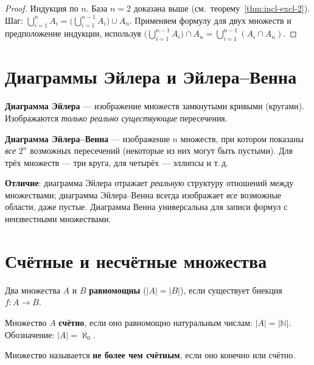 \documentclass[12pt]{article}
\begin{document}
\begin{proof}
Индукция по $n$. База $n=2$ доказана выше (см.~теорему~\ref{thm:incl-excl-2}).
Шаг: $\bigcup_{i=1}^n A_i = \bigl(\bigcup_{i=1}^{n-1} A_i\bigr) \cup A_n$.
Применяем формулу для двух множеств и предположение индукции, используя
$\bigl(\bigcup_{i=1}^{n-1} A_i\bigr) \cap A_n = \bigcup_{i=1}^{n-1}(A_i \cap A_n)$.
\end{proof}

\section{Диаграммы Эйлера и Эйлера--Венна}

\begin{definition}
\textbf{Диаграмма Эйлера} --- изображение множеств замкнутыми
кривыми (кругами). Изображаются \emph{только реально существующие}
пересечения.
\end{definition}

\begin{definition}
\textbf{Диаграмма Эйлера--Венна} --- изображение $n$ множеств,
при котором показаны \emph{все} $2^n$ возможных пересечений
(некоторые из них могут быть пустыми). Для трёх множеств ---
три круга, для четырёх --- эллипсы и т.\,д.
\end{definition}

\begin{note}
\textbf{Отличие}: диаграмма Эйлера отражает \emph{реальную} структуру
отношений между множествами; диаграмма Эйлера--Венна всегда
изображает \emph{все} возможные области, даже пустые.
Диаграмма Венна универсальна для записи формул с неизвестными
множествами.
\end{note}

\section{Счётные и несчётные множества}

\begin{definition}
Два множества $A$ и $B$ \textbf{равномощны} ($|A| = |B|$),
если существует биекция $f\colon A \to B$.
\end{definition}

\begin{definition}
Множество $A$ \textbf{счётно}, если оно равномощно натуральным
числам: $|A| = |\mathbb{N}|$. Обозначение: $|A| = \aleph_0$.

Множество называется \textbf{не более чем счётным}, если оно конечно
или счётно.
\end{definition}
\end{document}
